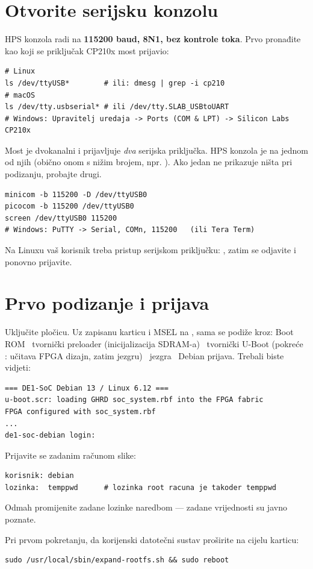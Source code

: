 \section{Otvorite serijsku konzolu}
HPS konzola radi na \textbf{115200 baud, 8N1, bez kontrole toka}. Prvo pronađite
kao koji se priključak CP210x most prijavio:
\begin{lstlisting}
# Linux
ls /dev/ttyUSB*        # ili: dmesg | grep -i cp210
# macOS
ls /dev/tty.usbserial* # ili /dev/tty.SLAB_USBtoUART
# Windows: Upravitelj uredaja -> Ports (COM & LPT) -> Silicon Labs CP210x
\end{lstlisting}
\begin{tip}
Most je dvokanalni i prijavljuje \emph{dva} serijska priključka. HPS konzola je na
jednom od njih (obično onom s nižim brojem, npr. ). Ako jedan ne
prikazuje ništa pri podizanju, probajte drugi.
\end{tip}
\begin{lstlisting}
minicom -b 115200 -D /dev/ttyUSB0
picocom -b 115200 /dev/ttyUSB0
screen /dev/ttyUSB0 115200
# Windows: PuTTY -> Serial, COMn, 115200   (ili Tera Term)
\end{lstlisting}
\begin{note}[Napomena]
Na Linuxu vaš korisnik treba pristup serijskom priključku:
, zatim se odjavite i ponovno prijavite.
\end{note}

\section{Prvo podizanje i prijava}
Uključite pločicu. Uz zapisanu karticu i MSEL na , sama se podiže kroz:
Boot ROM \arr\ tvornički preloader (inicijalizacija SDRAM-a) \arr\ tvornički U-Boot
(pokreće : učitava FPGA dizajn, zatim jezgru) \arr\ jezgra \arr\
Debian prijava. Trebali biste vidjeti:
\begin{lstlisting}
=== DE1-SoC Debian 13 / Linux 6.12 ===
u-boot.scr: loading GHRD soc_system.rbf into the FPGA fabric
FPGA configured with soc_system.rbf
...
de1-soc-debian login:
\end{lstlisting}

\medskip\noindent Prijavite se zadanim računom slike:
\begin{lstlisting}
korisnik: debian
lozinka:  temppwd      # lozinka root racuna je takoder temppwd
\end{lstlisting}
\begin{warn}
Odmah promijenite zadane lozinke naredbom  --- zadane vrijednosti su javno poznate.
\end{warn}
Pri prvom pokretanju, da korijenski datotečni sustav proširite na cijelu karticu:
\begin{lstlisting}
sudo /usr/local/sbin/expand-rootfs.sh && sudo reboot
\end{lstlisting}

